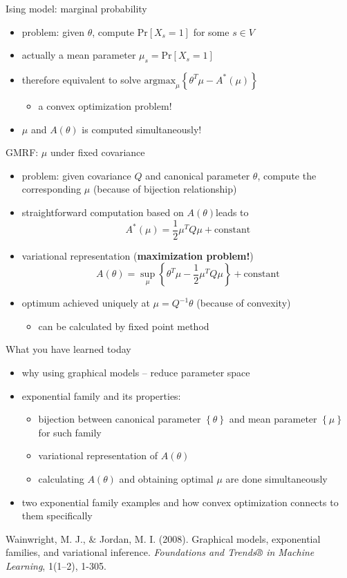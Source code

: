 \documentclass[t]{beamer}
\newcommand{\vparam}{\ensuremath{\theta}}
\newcommand{\set}[1]{\ensuremath{\left\{ #1 \right\}}}
\begin{document}
\begin{frame}{Ising model: marginal probability}
	\begin{itemize}
		\item problem: given $\theta$, compute $\text{Pr}[X_s=1]$ for some $s \in V$
		\item actually a mean parameter $\mu_s=\text{Pr}[X_s=1]$
		\item {therefore equivalent to solve $\text{argmax}_\mu \set{\theta^T \mu - A^{*}(\mu) } $
			\begin{itemize}
				\item a convex optimization problem!
			\end{itemize}
		}
		\item $\mu$ and $A(\theta)$ is computed simultaneously!		
	\end{itemize}
\end{frame}

\begin{frame}{GMRF: $\mu$ under fixed covariance}
	\begin{itemize}
		\item problem: given covariance $Q$ and canonical parameter $\vparam$, compute the corresponding $\mu$ (because of bijection relationship)
		\item {straightforward computation  based on $A(\theta) $leads to
			\[ A^{*}(\mu) = \frac{1}{2} \mu^T Q \mu + \text{constant} \]
		}
		\item {variational representation (\textbf{maximization problem!})
			 \[ A(\theta) = \sup_{\mu} \set{\theta^T \mu - \frac{1}{2} \mu^T Q \mu } + \text{constant} \]
		 }
		\item {optimum achieved uniquely at $\mu = Q^{-1} \theta$ (because of convexity)
			\begin{itemize}
				\item can be calculated by fixed point method
			\end{itemize}
		}
	\end{itemize}		
\end{frame}

\begin{frame}{What you have learned today}
	\begin{itemize}
		\item why using graphical models -- reduce parameter space
		\item {exponential family and its properties:
			\begin{itemize}		
			\item bijection between canonical parameter $\set{\theta}$ and mean parameter $\set{\mu}$ for such family
			\item variational representation of $A(\theta)$
			\item calculating $A(\theta)$ and obtaining optimal $\mu$ are done simultaneously
			\end{itemize}			
		}
		\item two exponential family examples and how convex optimization connects to them specifically
	\end{itemize}
\end{frame}

\begin{thebibliography}{9}

Wainwright, M. J., \& Jordan, M. I. (2008). 
Graphical models, exponential families, and variational inference. 
\textit{Foundations and Trends® in Machine Learning}, 
1(1–2), 1-305.
\end{thebibliography}
\end{document}
